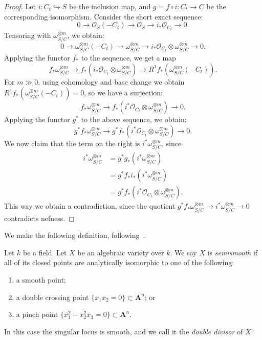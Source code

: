 \begin{proof}
Let $i:C_t\hookrightarrow S$ be the inclusion map, and $g=f\circ i:C_t\to C$ be the corresponding isomorphism.
Consider the short exact sequence:
$$0\to \mathcal{O}_S(-C_t)\to\mathcal{O}_S\to i_*\mathcal{O}_{C_t}\to 0.$$
Tensoring with $\omega_{S/C}^{\otimes m}$, we obtain:
$$0\to \omega_{S/C}^{\otimes m}(-C_t)\to \omega_{S/C}^{\otimes m}\to i_*\mathcal{O}_{C_t}\otimes\omega_{S/C}^{\otimes m}\to 0.$$
Applying the functor $f_*$ to the sequence, we get a map
$$f_*\omega_{S/C}^{\otimes m}\to f_*(i_*\mathcal{O}_{C_t}\otimes \omega_{S/C}^{\otimes m})\to R^1f_*(\omega_{S/C}^{\otimes m}(-C_t)).$$
For $m\gg 0$, using cohomology and base change we obtain $R^1f_*(\omega_{S/C}^{\otimes m}(-C_t))=0$, so we have a surjection:
$$f_*\omega_{S/C}^{\otimes m}\to f_*(i^*\mathcal{O}_{C_t}\otimes \omega_{S/C}^{\otimes m})\to 0.$$
Applying the functor $g^*$ to the above sequence, we obtain:
$$g^*f_*\omega_{S/C}^{\otimes m}\to g^*f_*(i^*\mathcal{O}_{C_t}\otimes \omega_{S/C}^{\otimes m})\to 0.$$
We now claim that the term on the right is $i^*\omega_{S/C}^{\otimes m}$, since
\begin{align}
i^*\omega_{S/C}^{\otimes m}& =g^*g_*(i^*\omega_{S/C}^{\otimes m})\nonumber\\
& =g^*f_*i_*(i^*\omega_{S/C}^{\otimes m})\nonumber\\
&=g^*f_*(i^*\mathcal{O}_{C_t}\otimes \omega_{S/C}^{\otimes m}).\nonumber
\end{align}
This way we obtain a contradiction, since the quotient $g^*f_*\omega_{S/C}^{\otimes m}\to i^*\omega_{S/C}^{\otimes m}\to 0$ contradicts nefness.
\end{proof}

We make the following definition, following~\cite[Definition 4.1(i)]{ko90}.

\begin{definition}
\label{definition-semismooth}
Let $k$ be a field.
Let $X$ be an algebraic variety over $k$.
We say $X$ is \textit{semismooth} if all of its closed points are analytically
isomorphic to one of the following:
\begin{enumerate}
\item a smooth point;
\item a double crossing point $\{x_1x_2 = 0\} \subset \mathbf{A}^n$; or
\item a pinch point $\{x_1^2 - x_2^2x_3 = 0\} \subset \mathbf{A}^n$.
\end{enumerate}
In this case the singular locus is smooth, and we call it the {\it double
divisor} of $X$.
\end{definition}

